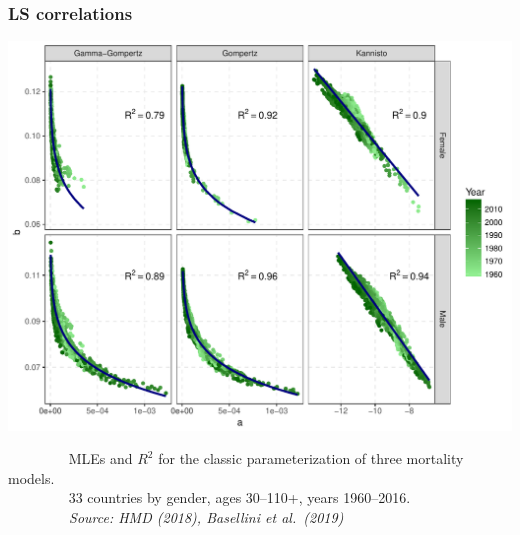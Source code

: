 \documentclass[12pt, xcolor=table]{beamer}  %
\begin{document}
\begin{frame}[noframenumbering]
\frametitle{LS correlations}
\vspace{-0.05cm}
\begin{center}
\includegraphics[scale=0.44]{Figures/Ch1/F6}
\end{center}
\vspace{-0.05cm}
\tiny{$\quad\quad\quad\quad$ MLEs and $R^2$ for the classic parameterization of three mortality models.\\ $\quad\quad\quad\quad$ 33 countries by gender, ages 30--110+, years 1960--2016. \\ \emph{$\quad\quad\quad\quad$ Source: HMD (2018), Basellini et al.~(2019)}} 
\end{frame}
\end{document}
